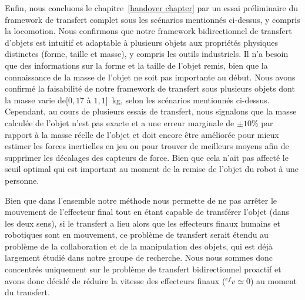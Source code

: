 Enfin, nous concluons le chapitre~\ref{handover chapter} par un essai préliminaire du framework de transfert complet sous les scénarios mentionnés ci-dessus, y compris la locomotion. Nous confirmons que notre framework bidirectionnel de transfert d'objets est intuitif et adaptable à plusieurs objets aux propriétés physiques distinctes (forme, taille et masse), y compris les outils industriels. Il n'a besoin que des informations sur la forme et la taille de l'objet remis, bien que la connaissance de la masse de l'objet ne soit pas importante au début. Nous avons confirmé la faisabilité de notre framework de transfert sous plusieurs objets dont la masse varie de[$0,17 $ à $ 1,1 $]~kg, selon les scénarios mentionnés ci-dessus. Cependant, au cours de plusieurs essais de transfert, nous signalons que la masse calculée de l'objet n'est pas exacte et a une erreur marginale de $ \pm10 $\% par rapport à la masse réelle de l'objet et doit encore être améliorée pour mieux estimer les forces inertielles en jeu ou pour trouver de meilleurs moyens afin de supprimer les décalages des capteurs de force. Bien que cela n'ait pas affecté le seuil optimal qui est important au moment de la remise de l'objet du robot à une personne.




Bien que dans l'ensemble notre méthode nous permette de ne pas arrêter le mouvement de l'effecteur final tout en étant capable de transférer l'objet (dans les deux sens), si le transfert a lieu alors que les effecteurs finaux humains et robotiques sont en mouvement, ce problème de transfert serait étendu au problème de la collaboration et de la manipulation des objets, qui est déjà largement étudié dans notre groupe de recherche. Nous nous sommes donc concentrés uniquement sur le problème de transfert bidirectionnel proactif et avons donc décidé de réduire la vitesse des effecteurs finaux (${}^{ef}v\simeq0$)  au moment du transfert. 


